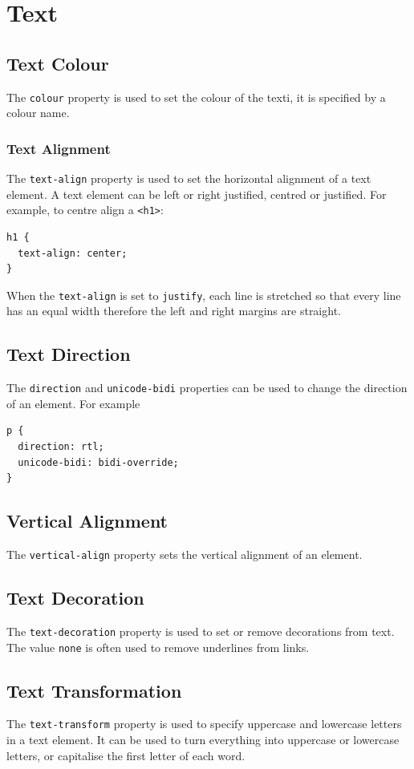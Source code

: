 \documentclass{thomasClass}
\begin{document}
\section{Text}
\subsection{Text Colour}
The \verb|colour| property is used to set the colour of the texti, it is specified by a colour name.
\subsubsection{Text Alignment}
The \verb|text-align| property is used to set the horizontal alignment of a text element. A text element can be left or right justified, centred or justified. For example, to centre align a \verb|<h1>|:
\begin{Verbatim}[breaklines=true, breakanywhere=true]
h1 {
  text-align: center;
}
\end{Verbatim}
When the \verb|text-align| is set to \verb|justify|, each line is stretched so that every line has an equal width therefore the left and right margins are straight.
\subsection{Text Direction}
The \verb|direction| and \verb|unicode-bidi| properties can be used to change the direction of an element. For example
\begin{Verbatim}[breaklines=true, breakanywhere=true]
p {
  direction: rtl;
  unicode-bidi: bidi-override;
}
\end{Verbatim}
\subsection{Vertical Alignment}
The \verb|vertical-align| property sets the vertical alignment of an element.
\subsection{Text Decoration}
The \verb|text-decoration| property is used to set or remove decorations from text. The value \verb|none| is often used to remove underlines from links.
\subsection{Text Transformation}
The \verb|text-transform| property is used to specify uppercase and lowercase letters in a text element. It can be used to turn everything into uppercase or lowercase letters, or capitalise the first letter of each word. 
\end{document}
